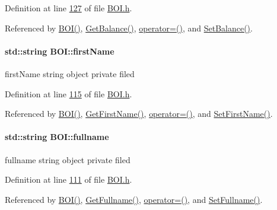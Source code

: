 Definition at line \hyperlink{_b_o_i_8h_source_l00127}{127} of file \hyperlink{_b_o_i_8h_source}{B\+O\+I.\+h}.



Referenced by \hyperlink{_b_o_i_8h_source_l00029}{B\+O\+I()}, \hyperlink{_b_o_i_8cpp_source_l00084}{Get\+Balance()}, \hyperlink{_b_o_i_8h_source_l00078}{operator=()}, and \hyperlink{_b_o_i_8cpp_source_l00078}{Set\+Balance()}.

\paragraph[{\texorpdfstring{first\+Name}{firstName}}]{\setlength{\rightskip}{0pt plus 5cm}std\+::string B\+O\+I\+::first\+Name\hspace{0.3cm}{\ttfamily [private]}}\hypertarget{class_b_o_i_a12872fd8c15dbf833f78862b00579ed1_a12872fd8c15dbf833f78862b00579ed1}{}\label{class_b_o_i_a12872fd8c15dbf833f78862b00579ed1_a12872fd8c15dbf833f78862b00579ed1}
first\+Name string object private filed 

Definition at line \hyperlink{_b_o_i_8h_source_l00115}{115} of file \hyperlink{_b_o_i_8h_source}{B\+O\+I.\+h}.



Referenced by \hyperlink{_b_o_i_8h_source_l00029}{B\+O\+I()}, \hyperlink{_b_o_i_8cpp_source_l00120}{Get\+First\+Name()}, \hyperlink{_b_o_i_8h_source_l00078}{operator=()}, and \hyperlink{_b_o_i_8cpp_source_l00114}{Set\+First\+Name()}.

\paragraph[{\texorpdfstring{fullname}{fullname}}]{\setlength{\rightskip}{0pt plus 5cm}std\+::string B\+O\+I\+::fullname\hspace{0.3cm}{\ttfamily [private]}}\hypertarget{class_b_o_i_a6d7c892a54bb6f7327cdc777081ab5f4_a6d7c892a54bb6f7327cdc777081ab5f4}{}\label{class_b_o_i_a6d7c892a54bb6f7327cdc777081ab5f4_a6d7c892a54bb6f7327cdc777081ab5f4}
fullname string object private filed 

Definition at line \hyperlink{_b_o_i_8h_source_l00111}{111} of file \hyperlink{_b_o_i_8h_source}{B\+O\+I.\+h}.



Referenced by \hyperlink{_b_o_i_8h_source_l00029}{B\+O\+I()}, \hyperlink{_b_o_i_8cpp_source_l00132}{Get\+Fullname()}, \hyperlink{_b_o_i_8h_source_l00078}{operator=()}, and \hyperlink{_b_o_i_8cpp_source_l00126}{Set\+Fullname()}.

